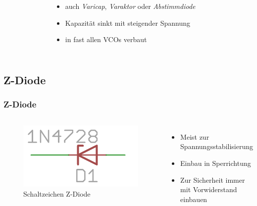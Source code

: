\begin{frame}
\begin{columns}[c]
\begin{center}
\begin{figure}
      \end{figure}
    \end{center}
    \begin{itemize}
      \item auch \emph{Varicap}, \emph{Varaktor} oder \emph{Abstimmdiode}
      \item Kapazität sinkt mit steigender Spannung
      \item in fast allen VCOs verbaut
    \end{itemize}
  \end{columns}
\end{frame}

\subsection*{Z-Diode}
\begin{frame}
  \frametitle{Z-Diode}
  \begin{columns}[c]
    \begin{center}
      \begin{figure}
        \includegraphics[width=.8\textwidth,height=.3\textheight,keepaspectratio]{a05/z-diode.png}
        \caption{Schaltzeichen Z-Diode}
      \end{figure}
    \end{center}
    \begin{itemize}
      \item Meist zur Spannungsstabilisierung
      \item Einbau in Sperrichtung
      \item Zur Sicherheit immer mit Vorwiderstand einbauen
    \end{itemize}
  \end{columns}
\end{frame}

